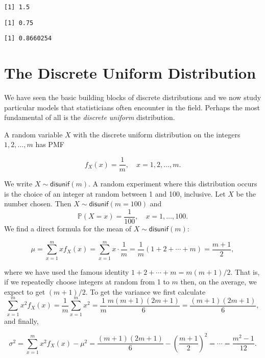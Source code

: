 \documentclass[]{book}
\numberwithin{equation}{chapter}
\numberwithin{figure}{chapter}
\theoremstyle{plain}
\theoremstyle{definition}
\theoremstyle{remark}
\theoremstyle{definition}
\theoremstyle{definition}
\theoremstyle{remark}
\begin{document}
\begin{verbatim}
[1] 1.5
\end{verbatim}

\begin{verbatim}
[1] 0.75
\end{verbatim}

\begin{verbatim}
[1] 0.8660254
\end{verbatim}

\section{The Discrete Uniform Distribution}\label{sec-disc-uniform-dist}

We have seen the basic building blocks of discrete distributions and we
now study particular models that statisticians often encounter in the
field. Perhaps the most fundamental of all is the \emph{discrete
uniform} distribution.

A random variable \(X\) with the discrete uniform distribution on the
integers \(1,2,\ldots,m\) has PMF

\begin{equation}
f_{X}(x)=\frac{1}{m},\quad x=1,2,\ldots,m.
\end{equation}

We write \(X\sim\mathsf{disunif}(m)\). A random experiment where this
distribution occurs is the choice of an integer at random between 1 and
100, inclusive. Let \(X\) be the number chosen. Then
\(X\sim\mathsf{disunif}(m=100)\) and \[
\mathbb{P}(X=x)=\frac{1}{100},\quad x=1,\ldots,100.
\] We find a direct formula for the mean of
\(X\sim\mathsf{disunif}(m)\):

\begin{equation}
\mu = \sum_{x = 1}^{m}xf_{X}(x) = \sum_{x = 1}^{m}x \cdot \frac{1}{m} = \frac{1}{m}(1 + 2 + \cdots + m) = \frac{m + 1}{2},
\end{equation}

where we have used the famous identity
\(1 + 2 + \cdots + m = m(m + 1)/2\). That is, if we repeatedly choose
integers at random from 1 to \(m\) then, on the average, we expect to
get \((m+1)/2\). To get the variance we first calculate
\[ \sum_{x = 1}^{m} x^{2} f_{X}(x) =
\frac{1}{m} \sum_{x = 1}^{m} x^{2} = \frac{1}{m}\frac{m(m + 1)(2m +
1)}{6} = \frac{(m + 1)(2m + 1)}{6}, \] and finally,

\begin{equation}
\sigma^{2} = \sum_{x = 1}^{m} x^{2} f_{X}(x) - \mu^{2} = \frac{(m + 1)(2m + 1)}{6} - \left(\frac{m + 1}{2}\right)^{2} = \cdots = \frac{m^{2} - 1}{12}.
\end{equation}
\end{document}
